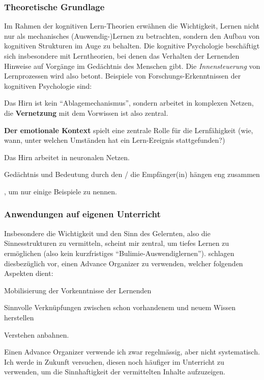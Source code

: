 \begin{myExBox}[title=Aspekt 2: Sinnvolles Lernen \& Advance Organizer]
\subsubsection*{Theoretische Grundlage}
Im Rahmen der kognitiven Lern-Theorien erwähnen  \textcite{alma99117228235505511} die Wichtigkeit, Lernen nicht nur als mechanisches (Auswendig-)Lernen zu betrachten, sondern den Aufbau von kognitiven Strukturen im Auge zu behalten. Die kognitive Psychologie beschäftigt sich insbesondere mit Lerntheorien, bei denen das Verhalten der Lernenden Hinweise auf Vorgänge im Gedächtnis des Menschen gibt. Die \textit{Innensteuerung} von Lernprozessen wird also betont. Beispiele von Forschungs-Erkenntnissen der kognitiven Psychologie sind: \begin{enumerate*}
\item Das Hirn ist kein ``Ablagemechanismus'', sondern arbeitet in komplexen Netzen, die \textbf{Vernetzung} mit dem Vorwissen ist also zentral.
\item \textbf{Der emotionale Kontext} spielt eine zentrale Rolle für die Lernfähigkeit (wie, wann, unter welchen Umständen hat ein Lern-Ereignis stattgefunden?)
\item Das Hirn arbeitet in neuronalen Netzen.
\item Gedächtnis und Bedeutung durch den / die Empfänger(in) hängen eng zusammen
\end{enumerate*}, um nur einige Beispiele zu nennen. 

\subsubsection*{Anwendungen auf eigenen Unterricht} Insbesondere die Wichtigkeit und den Sinn des Gelernten, also die Sinnesstrukturen zu vermitteln, scheint mir zentral, um tiefes Lernen zu ermöglichen (also kein kurzfristiges ``Bulimie-Auswendiglernen''). \textcite{alma99117228235505511} schlagen diesbezüglich vor, einen Advance Organizer zu verwenden, welcher folgenden Aspekten dient:
\begin{enumerate*}
\item Mobilisierung der Vorkenntnisse der Lernenden
\item Sinnvolle Verknüpfungen zwischen schon vorhandenem und neuem Wissen herstellen
\item Verstehen anbahnen.
\end{enumerate*}
Einen Advance Organizer verwende ich zwar regelmässig, aber nicht systematisch. Ich werde in Zukunft versuchen, diesen noch häufiger im Unterricht zu verwenden, um die Sinnhaftigkeit der vermittelten Inhalte aufzuzeigen.
\end{myExBox}

